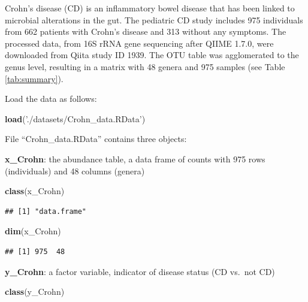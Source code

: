 \documentclass[openany]{book}
\newenvironment{Shaded}{\begin{snugshade}}{\end{snugshade}}
\newcommand{\KeywordTok}[1]{\textcolor[rgb]{0.13,0.29,0.53}{\textbf{#1}}}
\newcommand{\StringTok}[1]{\textcolor[rgb]{0.31,0.60,0.02}{#1}}
\newcommand{\NormalTok}[1]{#1}
\begin{document}
Crohn's disease (CD) is an inflammatory bowel disease that has been
linked to microbial alterations in the gut. The pediatric CD study
\citep{gevers2014treatment} includes 975 individuals from 662 patients
with Crohn's disease and 313 without any symptoms. The processed data,
from 16S rRNA gene sequencing after QIIME 1.7.0, were downloaded from
Qiita \citep{gonzalez2018qiita} study ID 1939. The OTU table was
agglomerated to the genus level, resulting in a matrix with 48 genera
and 975 samples (see Table \ref{tab:summary}).

Load the data as follows:

\begin{Shaded}
\begin{Highlighting}[]
\KeywordTok{load}\NormalTok{(}\StringTok{'./datasets/Crohn_data.RData'}\NormalTok{)}
\end{Highlighting}
\end{Shaded}

File ``Crohn\_data.RData'' contains three objects:

\textbf{x\_Crohn}: the abundance table, a data frame of counts with 975
rows (individuals) and 48 columns (genera)

\begin{Shaded}
\begin{Highlighting}[]
\KeywordTok{class}\NormalTok{(x_Crohn)}
\end{Highlighting}
\end{Shaded}

\begin{verbatim}
## [1] "data.frame"
\end{verbatim}

\begin{Shaded}
\begin{Highlighting}[]
\KeywordTok{dim}\NormalTok{(x_Crohn)}
\end{Highlighting}
\end{Shaded}

\begin{verbatim}
## [1] 975  48
\end{verbatim}

\textbf{y\_Crohn}: a factor variable, indicator of disease status (CD
vs.~not CD)

\begin{Shaded}
\begin{Highlighting}[]
\KeywordTok{class}\NormalTok{(y_Crohn)}
\end{Highlighting}
\end{Shaded}
\end{document}
